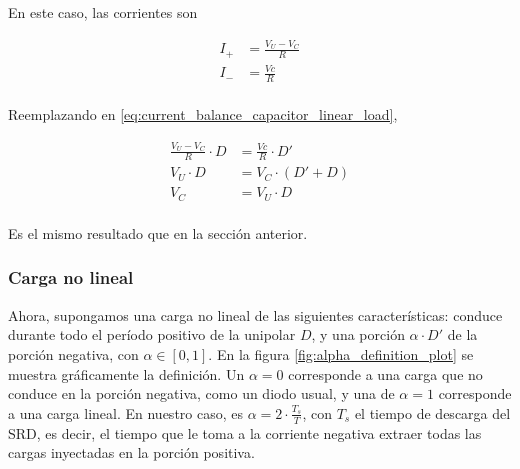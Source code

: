 En este caso, las corrientes son

\begin{equation}
    \label{eq:highpass_currents_linear_load}
    \begin{aligned}
        I_+ &= \frac{V_U-V_C}{R} \\
        I_- &= \frac{Vc}{R} \\
    \end{aligned}
\end{equation}

Reemplazando en \ref{eq:current_balance_capacitor_linear_load},

\begin{equation}
    \label{eq:vc_linear_load}
    \begin{aligned}
        \frac{V_U-V_C}{R} \cdot D &= \frac{Vc}{R} \cdot D' \\
        V_U \cdot D &= V_C \cdot \left( D'+D \right) \\
        V_C &= V_U \cdot D \\
    \end{aligned}
\end{equation}

Es el mismo resultado que en la sección anterior.

\subsubsection{Carga no lineal}

Ahora, supongamos una carga no lineal de las siguientes características: conduce
durante todo el período positivo de la unipolar $D$, y una porción $\alpha \cdot
D'$ de la porción negativa, con $\alpha \in \left[0, 1 \right]$. En la figura
\ref{fig:alpha_definition_plot} se muestra gráficamente la definición. Un
$\alpha=0$ corresponde a una carga que no conduce en la porción negativa, como
un diodo usual, y una de $\alpha=1$ corresponde a una carga lineal. En nuestro
caso, es $\alpha = 2 \cdot \frac{T_s}{T}$, con $T_s$ el tiempo de descarga del
SRD, es decir, el tiempo que le toma  a la corriente negativa extraer todas las
cargas inyectadas en la porción positiva.


